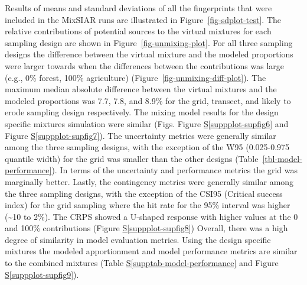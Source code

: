 \documentclass[
  number]{elsarticle}
\newcommand*\quartosuppplotref[1]{Figure \hyperref[#1]{S\ref{#1}}}
\newcommand*\quartosupptabref[1]{Table \hyperref[#1]{S\ref{#1}}}
\begin{document}
Results of means and standard deviations of all the fingerprints that
were included in the MixSIAR runs are illustrated in
Figure~\ref{fig-sdplot-test}. The relative contributions of potential
sources to the virtual mixtures for each sampling design are shown in
Figure~\ref{fig-unmixing-plot}. For all three sampling designs the
difference between the virtual mixture and the modeled proportions were
larger towards when the differences between the contributions was large
(e.g., 0\% forest, 100\% agriculture)
(Figure~\ref{fig-unmixing-diff-plot}). The maximum median absolute
difference between the virtual mixtures and the modeled proportions was
7.7, 7.8, and 8.9\% for the grid, transect, and likely to erode sampling
design respectively. The mixing model results for the design specific
mixtures simulation were similar (Figs.
\quartosuppplotref{suppplot-supfig6} and
\quartosuppplotref{suppplot-supfig7}). The uncertainty metrics were
generally similar among the three sampling designs, with the exception
of the W95 (0.025-0.975 quantile width) for the grid was smaller than
the other designs (Table~\ref{tbl-model-performance}). In terms of the
uncertainty and performance metrics the grid was marginally better.
Lastly, the contingency metrics were generally similar among the three
sampling designs, with the exception of the CSI95 (Critical success
index) for the grid sampling where the hit rate for the 95\% interval
was higher (\textasciitilde10 to 2\%). The CRPS showed a U-shaped
response with higher values at the 0 and 100\% contributions
(\quartosuppplotref{suppplot-supfig8}) Overall, there was a high degree
of similarity in model evaluation metrics. Using the design specific
mixtures the modeled apportionment and model performance metrics are
similar to the combined mixtures
(\quartosupptabref{supptab-model-performance} and
\quartosuppplotref{suppplot-supfig9}).
\end{document}
